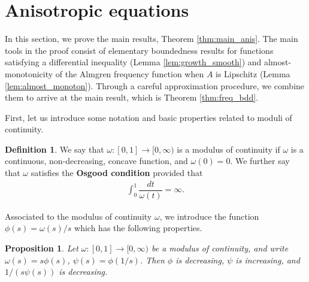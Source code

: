 \documentclass[12pt,leqno]{amsart}
\numberwithin{equation}{section}
\newtheorem{prop}[lemma]{Proposition}
\theoremstyle{definition}
\newtheorem{defn}[lemma]{\bf Definition}
\newcommand{\ra}{\rightarrow}
\begin{document}
\section{Anisotropic equations}\label{sec:anisotropic}


In this section, we prove the main results, Theorem \ref{thm:main_anis}. The main tools in the proof consist of elementary boundedness results for functions satisfying a differential inequality (Lemma \ref{lem:growth_smooth}) and almost-monotonicity of the Almgren frequency function when $A$ is Lipschitz (Lemma \ref{lem:almost_monoton}). Through a careful approximation procedure, we combine them to arrive at the main result, which is Theorem \ref{thm:freq_bdd}.

First, let us introduce some notation and basic properties related to moduli of continuity.


\begin{defn}
	We say that $\omega:[0, 1] \ra [0, \infty)$ is a modulus of continuity if $\omega$ is a continuous, non-decreasing, concave function, and $\omega(0) = 0$. We further say that $\omega$ satisfies the \textbf{Osgood condition} provided that 
	\begin{align}\label{eqn:osgood}
		\int_0^1 \dfrac{dt}{\omega(t)} = \infty.
	\end{align}
\end{defn}

Associated to the modulus of continuity $\omega$, we introduce the function $\phi(s) = \omega(s)/s$ which has the following properties.
\begin{prop}\label{prop:mod}
Let $\omega:[0,1] \ra [0, \infty)$ be a modulus of continuity, and write $\omega(s) = s\phi(s)$, $\psi(s) = \phi(1/s)$. Then $\phi$ is decreasing, $\psi$ is increasing, and $1/(s\psi(s))$ is decreasing. 
\end{prop}
\end{document}
